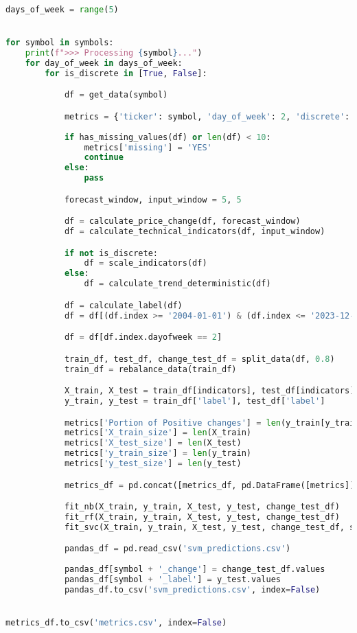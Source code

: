 \begin{lstlisting}[language=Python]
days_of_week = range(5)


for symbol in symbols:
    print(f">>> Processing {symbol}...")
    for day_of_week in days_of_week:
        for is_discrete in [True, False]:

            df = get_data(symbol)

            metrics = {'ticker': symbol, 'day_of_week': 2, 'discrete': True}
    
            if has_missing_values(df) or len(df) < 10:
                metrics['missing'] = 'YES'
                continue
            else:
                pass

            forecast_window, input_window = 5, 5

            df = calculate_price_change(df, forecast_window)
            df = calculate_technical_indicators(df, input_window)

            if not is_discrete:
                df = scale_indicators(df)
            else:
                df = calculate_trend_deterministic(df)

            df = calculate_label(df)
            df = df[(df.index >= '2004-01-01') & (df.index <= '2023-12-31')]

            df = df[df.index.dayofweek == 2]

            train_df, test_df, change_test_df = split_data(df, 0.8)
            train_df = rebalance_data(train_df)

            X_train, X_test = train_df[indicators], test_df[indicators]
            y_train, y_test = train_df['label'], test_df['label']

            metrics['Portion of Positive changes'] = len(y_train[y_train == 1]) / len(y_train)
            metrics['X_train_size'] = len(X_train)
            metrics['X_test_size'] = len(X_test)
            metrics['y_train_size'] = len(y_train)
            metrics['y_test_size'] = len(y_test)

            metrics_df = pd.concat([metrics_df, pd.DataFrame([metrics])], ignore_index=True)

            fit_nb(X_train, y_train, X_test, y_test, change_test_df)
            fit_rf(X_train, y_train, X_test, y_test, change_test_df)
            fit_svc(X_train, y_train, X_test, y_test, change_test_df, symbol)

            pandas_df = pd.read_csv('svm_predictions.csv')
            
            pandas_df[symbol + '_change'] = change_test_df.values
            pandas_df[symbol + '_label'] = y_test.values
            pandas_df.to_csv('svm_predictions.csv', index=False)


metrics_df.to_csv('metrics.csv', index=False)


\end{lstlisting}